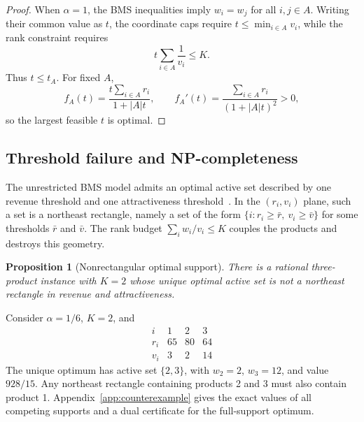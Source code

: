 \documentclass[11pt]{article}
\newtheorem{proposition}[theorem]{Proposition}
\begin{document}
\begin{proof}
When $\alpha=1$, the BMS inequalities imply $w_i=w_j$ for all $i,j\in A$. Writing their common value as $t$, the coordinate caps require $t\le\min_{i\in A}v_i$, while the rank constraint requires
\[
 t\sum_{i\in A}\frac1{v_i}\le K.
\]
Thus $t\le t_A$. For fixed $A$,
\[
 f_A(t)=\frac{t\sum_{i\in A}r_i}{1+|A|t},\qquad
 f_A'(t)=\frac{\sum_{i\in A}r_i}{(1+|A|t)^2}>0,
\]
so the largest feasible $t$ is optimal.
\end{proof}

\subsection{Threshold failure and NP-completeness}\label{sec:hardness}
The unrestricted BMS model admits an optimal active set described by one revenue threshold and one attractiveness threshold~\cite{EFTopaloglu}. In the $(r_i,v_i)$ plane, such a set is a northeast rectangle, namely a set of the form $\{i:r_i\ge\bar r,\ v_i\ge\bar v\}$ for some thresholds $\bar r$ and $\bar v$. The rank budget $\sum_iw_i/v_i\le K$ couples the products and destroys this geometry.

\begin{proposition}[Nonrectangular optimal support]\label{prop:nonrectangular}
There is a rational three-product instance with $K=2$ whose unique optimal active set is not a northeast rectangle in revenue and attractiveness.
\end{proposition}

Consider $\alpha=1/6$, $K=2$, and
\[
\begin{array}{c|ccc}
 i&1&2&3\\\hline
 r_i&65&80&64\\
 v_i&3&2&14
\end{array}
\]
The unique optimum has active set $\{2,3\}$, with $w_2=2$, $w_3=12$, and value $928/15$. Any northeast rectangle containing products 2 and 3 must also contain product 1. Appendix~\ref{app:counterexample} gives the exact values of all competing supports and a dual certificate for the full-support optimum.
\end{document}
